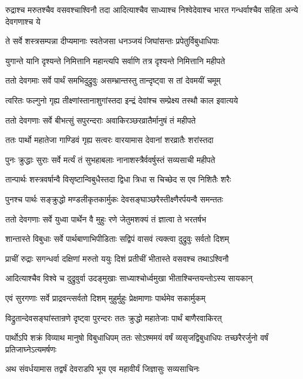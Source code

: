 \threelineshloka
{रुद्राश्च मरुतश्चैव वसवश्चाश्विनौ तदा}
{आदित्याश्चैव साध्याश्च निश्वेदेवाश्च भारत}
{गन्धर्वाश्चैव सहिता अन्ये देवगणाश्च ये}


\twolineshloka
{ते सर्वे शस्त्रसम्पन्ना दीप्यमानाः स्वतेजसा}
{धनञ्जयं जिघांसन्तः प्रपेतुर्विबुधाधिपाः}


\twolineshloka
{युगान्ते यानि दृश्यन्ते निमित्तानि महान्त्यपि}
{सर्वाणि तत्र दृश्यन्ते निमित्तानि महीपते}


\twolineshloka
{ततो देवगमाः सर्वे पार्थं समभिदुद्रुवुः}
{असम्भ्रान्तस्तु तान्दृष्ट्वा स तां देवमयीं चमूम्}


\twolineshloka
{त्वरितः फल्गुनो गृह्य तीक्ष्णांस्तानाशुगांस्तदा}
{इन्द्रं देवांश्च सम्प्रेक्ष्य तस्थौ काल इवात्यये}


\twolineshloka
{ततो देवगणाः सर्वे बीभत्सुं सपुरन्दराः}
{अवाकिरञ्छरव्रातैर्मानुषं तं महीपते}


\twolineshloka
{ततः पार्थो महातेजा गाण्डिवं गृह्य सत्वरः}
{वारयामास देवानां शरव्रातैः शरांस्तदा}


\twolineshloka
{पुनः क्रुद्धाः सुराः सर्वे मर्त्यं तं सुभहाबलाः}
{नानाशस्त्रैर्ववर्षुस्तं सव्यसाची महीपते}


\twolineshloka
{तान्पार्थः शस्त्रवर्षान्वै विसृष्टान्विबुधैस्तदा}
{द्विधा त्रिधा स चिच्छेद स एव निशितैः शरैः}


\twolineshloka
{पुनश्च पार्थः सङ्क्रुद्धो मण्डलीकृतकार्मुकः}
{देवसङ्घाञ्छरैस्तीक्ष्णैरर्पयन्वै समन्ततः}


\twolineshloka
{ततो देवगणाः सर्वे युध्वा पार्थेन वै मुहुः}
{रणे जेतुमशक्यं तं ज्ञात्वा ते भरतर्षभ}


\twolineshloka
{शान्तास्ते विबुधाः सर्वे पार्थबाणाभिपीडिताः}
{सद्विपं वासवं त्यक्त्वा दुद्रुवुः सर्वतो दिशम्}


\twolineshloka
{प्राचीं रुद्राः सगन्धर्वा दक्षिणां मरुतो ययुः}
{दिशं प्रतीचीं भीतास्ते वसवश्च तथाऽश्विनौ}


\twolineshloka
{आदित्याश्चैव विश्वे च दुद्रुवुर्वा उदङ्मुखाः}
{साध्याश्चोर्ध्वमुखा भीताश्चिन्तयन्तोऽस्य सायकान्}


\twolineshloka
{एवं सुरगणाः सर्वे प्राद्रवन्त्सर्वतो दिशम्}
{मुहुर्मुहुः प्रेक्षमाणाः पार्थमेव सकार्मुकम्}


\twolineshloka
{विद्रुतान्देवसङ्घांस्तान्रणे दृष्ट्वा पुरन्दरः}
{ततः क्रुद्धो महातेजाः पार्थं बाणैरवाकिरत्}


पार्थोऽपि शक्रं विव्याथ मानुषो विबुधाधिपम्
\twolineshloka
{ततः सोऽश्ममयं वर्षं व्यसृजद्विबुधाधिपः}
{तच्छरैरर्जुनो वर्षं प्रतिजाघ्नेऽत्यमर्षणः}


\twolineshloka
{अथ संवर्धयामास तद्वर्षं देवराडपि}
{भूय एव महावीर्यं जिज्ञासुः सव्यसाचिनः}


